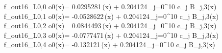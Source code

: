 f_{out16_L0,0	o0}(x)= 0.0295281\,\phi(x) + 0.204124\,\sum_{j=0}^{10} c_j B_{j,3}(x)
f_{out16_L0,1	o0}(x)= -0.0528622\,\phi(x) + 0.204124\,\sum_{j=0}^{10} c_j B_{j,3}(x)
f_{out16_L0,2	o0}(x)= 0.0844493\,\phi(x) + 0.204124\,\sum_{j=0}^{10} c_j B_{j,3}(x)
f_{out16_L0,3	o0}(x)= -0.0777471\,\phi(x) + 0.204124\,\sum_{j=0}^{10} c_j B_{j,3}(x)
f_{out16_L0,4	o0}(x)= -0.132121\,\phi(x) + 0.204124\,\sum_{j=0}^{10} c_j B_{j,3}(x)
